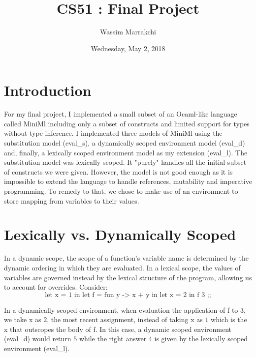 \documentclass[11pt]{article}
\author{Wassim Marrakchi}
\date{Wednesday, May 2, 2018}
\title{CS51 : Final Project}
\theoremstyle{definition}
\begin{document}
\maketitle
\section{Introduction}
For my final project, I implemented a small subset of an Ocaml-like language called MiniMl including only a subset of constructs and limited support for types without type inference. I implemented three models of MiniMl using the substitution model (eval\_s), a dynamically scoped environment model (eval\_d) and, finally, a lexically scoped environment model as my extension (eval\_l). The substitution model was lexically scoped. It "purely" handles all the initial subset of constructs we were given. However, the model is not good enough as it is impossible to extend the language to handle references, mutability and imperative programming. To remedy to that, we chose to make use of an environment to store mapping from variables to their values.
\section{Lexically vs. Dynamically Scoped}
\indent In a dynamic scope, the scope of a function's variable name is determined by the dynamic ordering in which they are evaluated. In a lexical scope, the values of variables are governed instead by the lexical structure of the program, allowing us to account for overrides. Consider:
\[\text{let x = 1 in let f = fun y -$>$ x + y in let x = 2 in f 3 ;;}\]
\par\indent In a dynamically scoped environment, when evaluation the application of f to $3$, we take x as $2$, the most recent assignment, instead of taking x as $1$ which is the x that outscopes the body of f. In this case, a dynamic scoped environment (eval\_d) would return $5$ while the right answer  $4$ is given by the lexically scoped environment (eval\_l).
\end{document}
